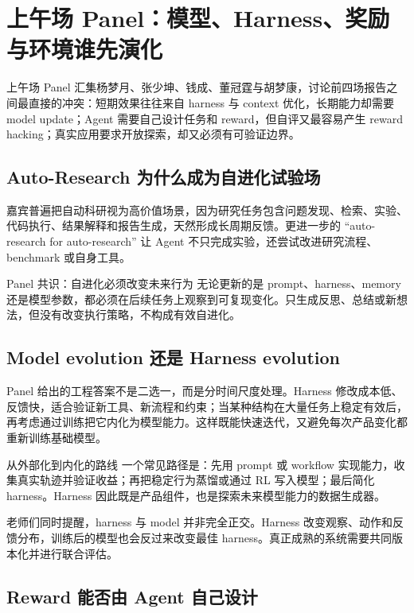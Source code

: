 \section{上午场 Panel：模型、Harness、奖励与环境谁先演化}

上午场 Panel 汇集杨梦月、张少坤、钱成、董冠霆与胡梦康，讨论前四场报告之间最直接的冲突：短期效果往往来自 harness 与 context 优化，长期能力却需要 model update；Agent 需要自己设计任务和 reward，但自评又最容易产生 reward hacking；真实应用要求开放探索，却又必须有可验证边界。

\subsection{Auto-Research 为什么成为自进化试验场}

嘉宾普遍把自动科研视为高价值场景，因为研究任务包含问题发现、检索、实验、代码执行、结果解释和报告生成，天然形成长周期反馈。更进一步的 ``auto-research for auto-research'' 让 Agent 不只完成实验，还尝试改进研究流程、benchmark 或自身工具。

\begin{importantbox}{Panel 共识：自进化必须改变未来行为}
无论更新的是 prompt、harness、memory 还是模型参数，都必须在后续任务上观察到可复现变化。只生成反思、总结或新想法，但没有改变执行策略，不构成有效自进化。
\end{importantbox}

\subsection{Model evolution 还是 Harness evolution}

Panel 给出的工程答案不是二选一，而是分时间尺度处理。Harness 修改成本低、反馈快，适合验证新工具、新流程和约束；当某种结构在大量任务上稳定有效后，再考虑通过训练把它内化为模型能力。这样既能快速迭代，又避免每次产品变化都重新训练基础模型。

\begin{knowledgebox}{从外部化到内化的路线}
一个常见路径是：先用 prompt 或 workflow 实现能力，收集真实轨迹并验证收益；再把稳定行为蒸馏或通过 RL 写入模型；最后简化 harness。Harness 因此既是产品组件，也是探索未来模型能力的数据生成器。
\end{knowledgebox}

老师们同时提醒，harness 与 model 并非完全正交。Harness 改变观察、动作和反馈分布，训练后的模型也会反过来改变最佳 harness。真正成熟的系统需要共同版本化并进行联合评估。

\subsection{Reward 能否由 Agent 自己设计}

